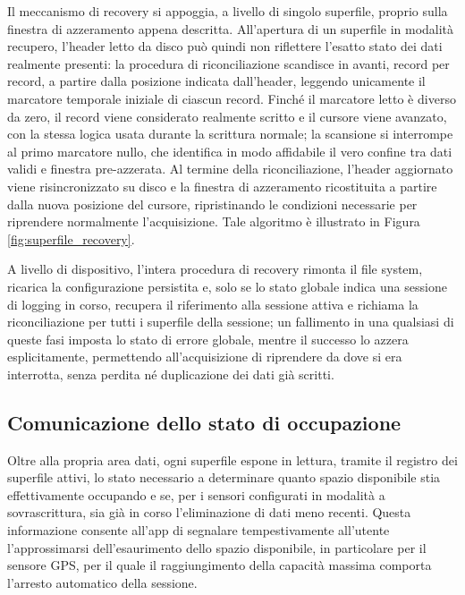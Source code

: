 Il meccanismo di recovery si appoggia, a livello di singolo superfile, proprio sulla finestra di azzeramento appena descritta.
All'apertura di un superfile in modalità recupero, l'header letto da disco può quindi non riflettere l'esatto stato dei dati realmente presenti: 
la procedura di riconciliazione scandisce in avanti, record per record,
a partire dalla posizione indicata dall'header, leggendo unicamente il marcatore temporale iniziale di ciascun record. Finché il marcatore letto è
diverso da zero, il record viene considerato realmente scritto e il cursore viene avanzato, con la stessa logica usata durante la scrittura normale;
la scansione si interrompe al primo marcatore nullo, che identifica in modo affidabile il vero confine tra dati validi e finestra pre-azzerata. Al
termine della riconciliazione, l'header aggiornato viene risincronizzato su disco e la finestra di azzeramento ricostituita a partire dalla nuova
posizione del cursore, ripristinando le condizioni necessarie per riprendere normalmente l'acquisizione. Tale algoritmo è illustrato in Figura 
\ref{fig:superfile_recovery}.

A livello di dispositivo, l'intera procedura di recovery rimonta il file system, ricarica la configurazione persistita e, solo se lo stato globale
indica una sessione di logging in corso, recupera il riferimento alla sessione attiva e richiama la riconciliazione per tutti i superfile della
sessione; un fallimento in una qualsiasi di queste fasi imposta lo stato di errore globale, mentre il successo lo azzera esplicitamente, permettendo
all'acquisizione di riprendere da dove si era interrotta, senza perdita né duplicazione dei dati già scritti.

\subsection{Comunicazione dello stato di occupazione} \label{subsec:storage_status}

Oltre alla propria area dati, ogni superfile espone in lettura, tramite il registro dei
superfile attivi, lo stato necessario a determinare quanto spazio disponibile stia
effettivamente occupando e se, per i sensori configurati in modalità a sovrascrittura,
sia già in corso l'eliminazione di dati meno recenti. Questa informazione consente
all'app di segnalare tempestivamente all'utente l'approssimarsi dell'esaurimento dello
spazio disponibile, in particolare per il sensore GPS, per il quale il raggiungimento
della capacità massima comporta l'arresto automatico della sessione.

